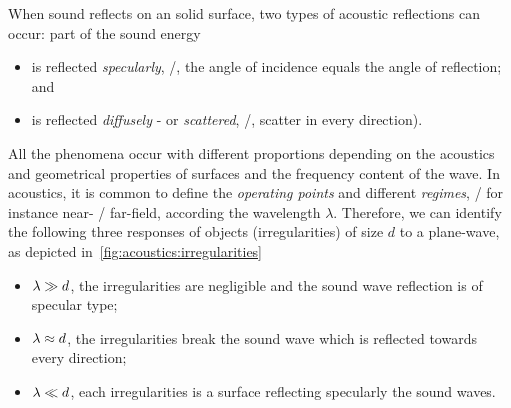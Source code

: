\mynewline
When sound reflects on an solid surface, two types of acoustic reflections can occur: part of the sound energy
\begin{itemize}
    \item is reflected \textit{specularly}, \ie/, the angle of incidence equals the angle of reflection; and
    \item is reflected \textit{diffusely} - or \textit{scattered}, \ie/, scatter in every direction).
\end{itemize}
All the phenomena occur with different proportions depending on the acoustics and geometrical properties of surfaces and the frequency content of the wave.
In acoustics, it is common to define the \textit{operating points} and different \textit{regimes}, \eg/ for instance near- \vs/ far-field, according the wavelength $\lambda$.
Therefore, we can identify the following three responses of objects (irregularities) of size $d$ to a plane-wave, as depicted in~\cref{fig:acoustics:irregularities}
\begin{itemize}
    \item $\lambda \gg d$, the irregularities are negligible and the sound wave reflection is of specular type;
    \item $\lambda \approx d$, the irregularities break the sound wave which is reflected towards every direction;
    \item $\lambda \ll d$, each irregularities is a surface reflecting specularly the sound waves.
\end{itemize}

\begin{figure}[h]
    \footnotesize
    \resizebox{\linewidth}{!}{
        
    }
    \vspace{-\baselineskip}\vspace{-\baselineskip}
\end{figure}

